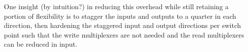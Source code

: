 
One insight (by intuition?) in reducing this overhead while still retaining a portion of flexibility is to stagger the inputs and outputs to a quarter in each direction, then hardening the staggered input and output directions per switch point such that the write multiplexers are not needed and the read multiplexers can be reduced in input.






